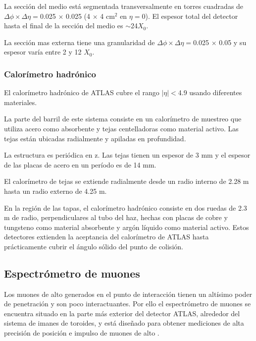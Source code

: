 La sección del medio está segmentada transversalmente en torres cuadradas de $\Delta \phi \times \Delta \eta=$0.025 $\times$ 0.025 (4 $\times$ 4 cm$^2$ en $\eta=0$).
El espesor total del detector hasta el final de la sección del medio es $\sim$24$X_0$.

La sección mas externa tiene una granularidad de $\Delta\phi\times\Delta\eta=$0.025 $\times$ 0.05 y su espesor varía entre 2 y 12 $X_0$.

\subsubsection{Calorímetro hadrónico}
El calorímetro hadrónico de ATLAS \cite{calohadTDR} cubre el rango $|\eta|<$4.9 usando diferentes materiales.

La parte del barril de este sistema consiste en un calorímetro de muestreo que utiliza
acero como absorbente y tejas centelladoras como material activo.
Las tejas están ubicadas radialmente y apiladas en profundidad.


La estructura es periódica en z. Las tejas tienen un espesor de 3 mm y el
espesor de las placas de acero en un período es de 14 mm.

El calorímetro de tejas se extiende radialmente desde un radio interno de 2.28 m
hasta un radio externo de 4.25 m.

En la región de las tapas, el calorímetro hadrónico consiste en dos ruedas de 2.3 m de
radio, perpendiculares al tubo del haz, hechas con placas de cobre y tungsteno como material
absorbente y argón líquido como material activo.
Estos detectores extienden la aceptancia del calorímetro de ATLAS hasta prácticamente
cubrir el ángulo sólido del punto de colisión.


\subsection{Espectrómetro de muones}
Los muones de alto {\pt} generados en el punto de interacción tienen un altísimo poder de
penetración y son poco interactuantes.
Por ello el espectrómetro de muones \cite{muonTDR} se encuentra situado en la parte más
exterior del detector ATLAS, alrededor del sistema de imanes de toroides,
y está diseñado para obtener mediciones de alta precisión de posición e impulso de muones de alto \pt.

